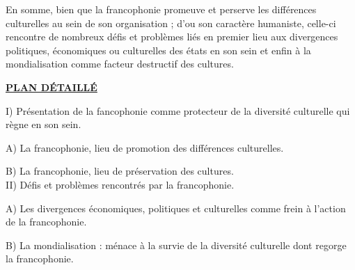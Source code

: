 En somme, bien que la francophonie promeuve et perserve les différences culturelles au sein de son organisation ; d'ou son caractère humaniste, celle-ci rencontre de nombreux défis et problèmes liés en premier lieu aux divergences politiques, économiques ou culturelles des états en son sein et enfin à la mondialisation comme facteur destructif des cultures.

\newpage \begin{center}
	\textbf{\underline{PLAN D\'ETAILL\'E}}
\end{center}
\noindent I) Présentation de la fancophonie comme protecteur de la diversité culturelle qui règne en son sein.

\indent A) La francophonie, lieu de promotion des différences culturelles.

\indent B) La francophonie, lieu de préservation des cultures.\\

\noindent II) Défis et problèmes rencontrés par la francophonie.

\indent A) Les divergences économiques, politiques et culturelles comme frein à l'action de la francophonie.

\indent B) La mondialisation : ménace à la survie de la diversité culturelle dont regorge la francophonie.

